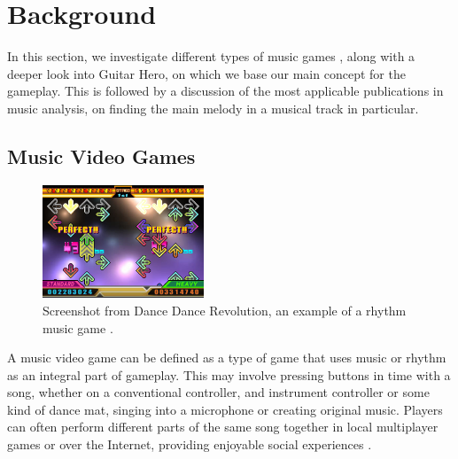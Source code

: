 
\chapter{Background} %

\label{Chapter4} %



In this section, we investigate different types of music games \cite{gametypes}, along with a deeper look into Guitar Hero, on which we base our main concept for the gameplay. This is followed by a discussion of the most applicable publications in music analysis, on finding the main melody in a musical track in particular.

\vspace{20pt}


\section{Music Video Games }

\begin{figure}
  \vspace{-40pt}

  \begin{center}
    \includegraphics[width=0.43\textwidth]{Figures/dancedancerevolution}
  \end{center}
  \caption{Screenshot from Dance Dance Revolution, an example of a rhythm music game \cite{DDR}.}
  \label{fig:DDR}
\end{figure}

A music video game can be defined as a type of game that uses music or rhythm as an integral part of gameplay. This may involve pressing buttons in time with a song, whether on a conventional controller, and instrument controller or some kind of dance mat, singing into a microphone or creating original music. Players can often perform different parts of the same song together in local multiplayer games or over the Internet, providing enjoyable social experiences \cite{mvgdef}.

